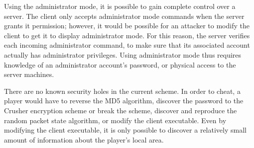 Using the administrator mode, it is possible to gain complete control
over a server.  The client only accepts administrator mode commands
when the server grants it permission; however, it would be possible
for an attacker to modify the client to get it to display
administrator mode.  For this reason, the server verifies each
incoming administrator command, to make sure that its associated
account actually has administrator privileges.  Using administrator
mode thus requires knowledge of an administrator account's password,
or physical access to the server machines.

There are no known security holes in the current scheme.  In order to
cheat, a player would have to reverse the MD5 algorithm, discover the
password to the Crusher encryption scheme or break the scheme,
discover and reproduce the random packet state algorithm, or modify
the client executable.  Even by modifying the client executable, it is
only possible to discover a relatively small amount of information
about the player's local area.
